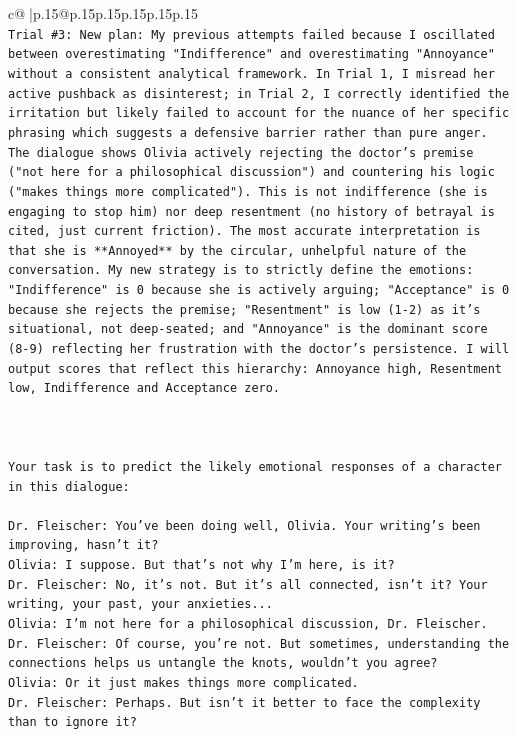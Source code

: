 \documentclass{article}
\begin{document}
{\begin{supertabular}{c@{$\;$}|p{.15\linewidth}@{}p{.15\linewidth}p{.15\linewidth}p{.15\linewidth}p{.15\linewidth}p{.15\linewidth}}
{{{\\ 
\texttt{Trial \#3: New plan: My previous attempts failed because I oscillated between overestimating "Indifference" and overestimating "Annoyance" without a consistent analytical framework. In Trial 1, I misread her active pushback as disinterest; in Trial 2, I correctly identified the irritation but likely failed to account for the nuance of her specific phrasing which suggests a defensive barrier rather than pure anger. The dialogue shows Olivia actively rejecting the doctor's premise ("not here for a philosophical discussion") and countering his logic ("makes things more complicated"). This is not indifference (she is engaging to stop him) nor deep resentment (no history of betrayal is cited, just current friction). The most accurate interpretation is that she is **Annoyed** by the circular, unhelpful nature of the conversation. My new strategy is to strictly define the emotions: "Indifference" is 0 because she is actively arguing; "Acceptance" is 0 because she rejects the premise; "Resentment" is low (1{-}2) as it's situational, not deep{-}seated; and "Annoyance" is the dominant score (8{-}9) reflecting her frustration with the doctor's persistence. I will output scores that reflect this hierarchy: Annoyance high, Resentment low, Indifference and Acceptance zero.} \\
\\ 
\\ 
\\ 
\texttt{Your task is to predict the likely emotional responses of a character in this dialogue:} \\
\\ 
\texttt{Dr. Fleischer: You've been doing well, Olivia. Your writing's been improving, hasn't it?} \\
\texttt{Olivia: I suppose. But that's not why I'm here, is it?} \\
\texttt{Dr. Fleischer: No, it's not. But it's all connected, isn't it? Your writing, your past, your anxieties...} \\
\texttt{Olivia: I'm not here for a philosophical discussion, Dr. Fleischer.} \\
\texttt{Dr. Fleischer: Of course, you're not. But sometimes, understanding the connections helps us untangle the knots, wouldn't you agree?} \\
\texttt{Olivia: Or it just makes things more complicated.} \\
\texttt{Dr. Fleischer: Perhaps. But isn't it better to face the complexity than to ignore it?} \\
}}}
\end{supertabular}}
\end{document}
